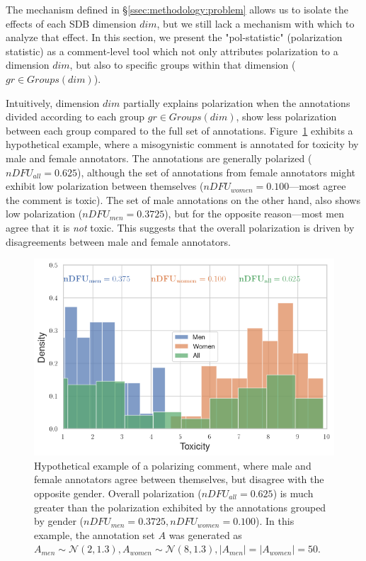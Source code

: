 \documentclass{article}
\newcommand{\sdbdim}{\textit{dim}}
\newcommand{\sdbgroup}{\textit{gr}}
\newcommand{\Sdbgroup}{\textit{Groups}}
\begin{document}
The mechanism defined in \S\ref{ssec:methodology:problem} allows us to isolate the effects of each \ac{SDB} dimension $\sdbdim$, but we still lack a mechanism with which to analyze that effect. In this section, we present the "pol-statistic" (polarization statistic) as a comment-level tool which not only attributes polarization to a dimension $\sdbdim$, but also to specific groups within that dimension ($\sdbgroup \in \Sdbgroup(\sdbdim)$).

Intuitively, dimension $\sdbdim$ partially explains polarization when the annotations divided according to each group $\sdbgroup \in \Sdbgroup(\sdbdim)$, show less polarization between each group compared to the full set of annotations. Figure~\ref{fig:ndfu_single_comment} exhibits a hypothetical example, where a misogynistic comment is annotated for toxicity by male and female annotators. The annotations are generally polarized ($nDFU_{all} = 0.625$), although the set of annotations from female annotators might exhibit low polarization between themselves ($nDFU_{women} = 0.100$---most agree the comment is toxic). The set of male annotations on the other hand, also shows low polarization ($nDFU_{men} = 0.3725$), but for the opposite reason---most men agree that it is \emph{not} toxic. This suggests that the overall polarization is driven by disagreements between male and female annotators. 

\begin{figure}
	\centering
	\includegraphics[width=0.8\linewidth]{ndfu_single_comment.png}
	\caption{Hypothetical example of a polarizing comment, where male and female annotators agree between themselves, but disagree with the opposite gender. Overall polarization ($nDFU_{all} = 0.625$) is much greater than the polarization exhibited by the annotations grouped by gender ($nDFU_{men} = 0.3725, nDFU_{women} = 0.100$). In this example, the annotation set $A$ was generated as $A_{men} \sim \mathcal{N}(2, 1.3), A_{women} \sim \mathcal{N}(8, 1.3), \lvert A_{men} \rvert = \lvert A_{women} \rvert = 50$.}
	\label{fig:ndfu_single_comment}
\end{figure}
\end{document}
